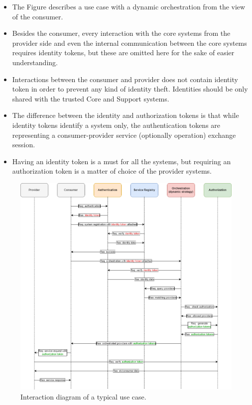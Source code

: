 \documentclass[a4paper]{arrowhead}
\begin{document}
\begin{itemize}
    \item The Figure describes a use case with a dynamic orchestration from the view of the consumer.
    \item Besides the consumer, every interaction with the core systems from the provider side and even the internal communication between the core systems requires identity tokens, but these are omitted here for the sake of easier understanding.
    \item Interactions between the consumer and provider does not contain identity token in order to prevent any kind of identity theft. Identities should be only shared with the trusted Core and Support systems.
    \item The difference between the identity and authorization tokens is that while identity tokens identify a system only, the authentication tokens are representing a consumer-provider service (optionally operation) exchange session.
    \item Having an identity token is a must for all the systems, but requiring an authorization token is a matter of choice of the provider systems.
\end{itemize}

\begin{figure}[ht!]
  \centering
  \includegraphics[width=\textwidth]{figures/auth_interactions}
  \caption{Interaction diagram of a typical use case. }
  \label{fig:auth_interactions}
\end{figure}
\end{document}
